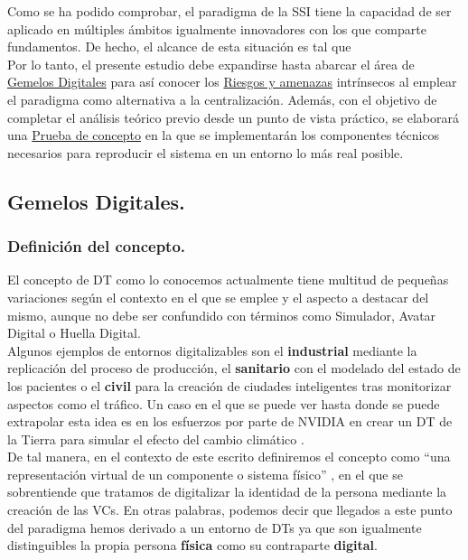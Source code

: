 \documentclass[../main.tex]{subfiles}
\begin{document}
Como se ha podido comprobar, el paradigma de la \acrshort{SSI} tiene la capacidad de ser aplicado en múltiples ámbitos igualmente innovadores con los que comparte fundamentos. De hecho, el alcance de esta situación es tal que 
\\

Por lo tanto, el presente estudio debe expandirse hasta abarcar el área de \hyperref[Gemelos Digitales]{Gemelos Digitales} para así conocer los \hyperref[Riesgos y amenazas]{Riesgos y amenazas} intrínsecos al emplear el paradigma como alternativa a la centralización. Además, con el objetivo de completar el análisis teórico previo desde un punto de vista práctico, se elaborará una \hyperref[Prueba de concepto]{Prueba de concepto} en la que se implementarán los componentes técnicos necesarios para reproducir el sistema en un entorno lo más real posible.
\\

\subsection{Gemelos Digitales.}\label{Gemelos Digitales}
\subsubsection{Definición del concepto.}\label{Definición del concepto}
El concepto de \acrfull{DT} como lo conocemos actualmente tiene multitud de pequeñas variaciones según el contexto en el que se emplee y el aspecto a destacar del mismo, aunque no debe ser confundido con términos como \Gls{Simulador}, \Gls{Avatar Digital} o \Gls{Huella Digital}. 
\\

Algunos ejemplos de entornos digitalizables son el \textbf{industrial} mediante la replicación del proceso de producción, el \textbf{sanitario} con el modelado del estado de los pacientes o el \textbf{civil} para la creación de ciudades inteligentes tras monitorizar aspectos como el tráfico. Un caso en el que se puede ver hasta donde se puede extrapolar esta idea es en los esfuerzos por parte de NVIDIA en crear un \acrshort{DT} de la Tierra para simular el efecto del cambio climático \cite{Earth_NVIDIA}.
\\

\newpage
De tal manera, en el contexto de este escrito definiremos el concepto como ``una representación virtual de un componente o sistema físico'' \cite{DT_NVIDIA}, en el que se sobrentiende que tratamos de digitalizar la identidad de la persona mediante la creación de las \acrshort{VC}s. En otras palabras, podemos decir que llegados a este punto del paradigma hemos derivado a un entorno de \acrshort{DT}s ya que son igualmente distinguibles la propia persona \textbf{física} como su contraparte \textbf{digital}. 
\\
\end{document}
